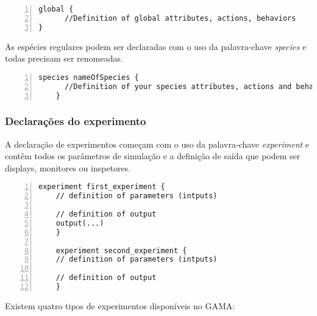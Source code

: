 \begin{lstlisting}[numbers=left, caption={Código}]
    global {
      //Definition of global attributes, actions, behaviors
}
\end{lstlisting}

As espécies regulares podem ser declaradas com o uso da palavra-chave \textit{species} e todas precisam ser renomeadas.

\begin{lstlisting}[numbers=left, caption={Código}]
    species nameOfSpecies {
      //Definition of your species attributes, actions and behaviors and aspects
    }
\end{lstlisting}


\subsubsection{Declarações do experimento}

A declaração de experimentos começam com o uso da palavra-chave \textit{experiment} e contêm todos os parâmetros de simulação e a definição de saída que podem ser displays, monitores ou inspetores. 

\begin{lstlisting}[numbers=left, caption={Código}]
    experiment first_experiment {
	// definition of parameters (intputs)

	// definition of output
	output(...)
    }

    experiment second_experiment {
	// definition of parameters (intputs)

	// definition of output
    }
\end{lstlisting}


Existem quatro tipos de experimentos disponíveis no GAMA:


